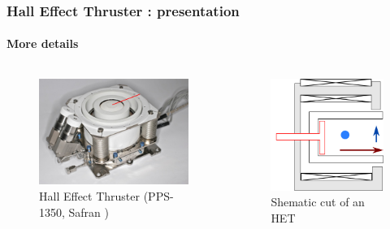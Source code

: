 \documentclass[sans, aspectratio=169]{beamer}
\begin{document}
\begin{frame} 
	\frametitle{Hall Effect Thruster : presentation} 
	\framesubtitle{More details} 

\begin{columns}

	\begin{column}{0.45\linewidth}
		\begin{figure}[hbtp]
		\centering
		\includegraphics[scale=0.25]{images/PPS1350-G.png}
		\caption{Hall Effect Thruster (PPS-1350, Safran )}
		\end{figure}
	
	\end{column}

	\begin{column}{0.45\linewidth}
		\begin{figure}[hbtp]
		\centering
		\includegraphics[scale=0.7]{images/HET.png}
		\caption{Shematic cut of an HET}
		\end{figure}
	

\end{column}
\end{columns}
\end{frame}
\end{document}
